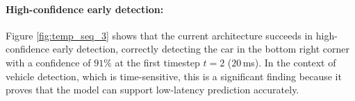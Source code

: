 \paragraph{High-confidence early detection:}
Figure \ref{fig:temp_seq_3} shows that the current architecture succeeds in high-confidence early detection,
correctly detecting the car in the bottom right corner with a confidence of $91\%$ at the first timestep $t=2$ ($20$\,ms).
In the context of vehicle detection, which is time-sensitive, this is a significant finding because it proves that the model can support low-latency prediction accurately.
